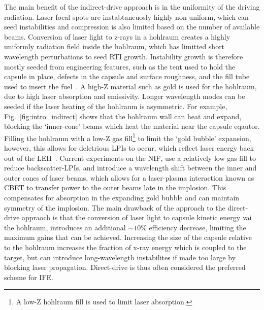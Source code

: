 The main benefit of the indirect-drive approach is in the uniformity of the driving radiation.
Laser focal spots are instabtaneuosly highly non-uniform, which can seed instabilities and compression is also limited based on the number of available beams.
Conversion of laser light to z-rays in a hohlraum creates a highly uniformly radiation field inside the hohlraum, which has limitted short wavelength perturbations to seed \ac{RTI} growth.
Instability growth is therefore mostly seeded from engineering features, such as the tent used to hold the capsule in place, defects in the capsule and surface roughness, and the fill tube used to insert the fuel~\cite{clark_three-dimensional_2016}.
A high-Z material such as gold is used for the hohlraum, due to high laser absorption and emissivity.
Longer wavelength modes can be seeded if the laser heating of the hohlraum is asymmetric.
For example, Fig.~\ref{fig:intro_indirect} shows that the hohlraum wall can heat and expand, blocking the `inner-cone' beams which heat the material near the capsule eqautor.
Filling the hohlraum with a low-Z gas fill\footnote{A low-Z hohlraum fill is used to limit laser absorption.} to limit the `gold bubble' expansion, however, this allows for deletrious \ac{LPIs} to occur, which reflect laser energy back out of the \ac{LEH}~\cite{macgowan_laserplasma_1996}.
Current experiments on the \ac{NIF}, use a relatively low gas fill to reduce backscatter-\ac{LPIs}, and introduce a wavelength shift between the inner and outer cones of laser beams, which allows for a laser-plasma interaction known as \ac{CBET} to transfer power to the outer beams late in the implosion\cite{michel_tuning_2009,moody_multistep_2012,kritcher_energy_2018}.
This compensates for absorption in the expanding gold bubble and can maintain symmetry of the implosion.
The main drawback of the approach to the direct-drive appraoch is that the conversion of laser light to capsule kinetic energy vai the hohlraum, introduces an additional $\sim10\%$ efficiency decrease, limiting the maximum gains that can be achieved.
Increasing the size of the capsule relative to the hohlraum increases the fraction of x-ray energy which is coupled to the target, but can introduce long-wavelength instabilites if made too large by blocking laser propagation.
Direct-drive is thus often considered the preferred scheme for \ac{IFE}.

